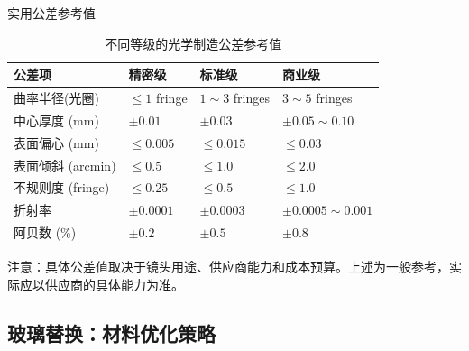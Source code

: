 \begin{frame}{实用公差参考值}
    \begin{table}
        \centering
        \small
        \setlength{\tabcolsep}{3pt}
        \begin{tabular}{p{2.8cm}|p{2.5cm}|p{2.5cm}|p{2.5cm}}
            \toprule
            \textbf{公差项} & \textbf{精密级} & \textbf{标准级} & \textbf{商业级} \\
            \midrule
            曲率半径(光圈) & $\le 1$ fringe & $1\sim 3$ fringes & $3\sim 5$ fringes \\
            中心厚度 (mm)     & $\pm 0.01$ & $\pm 0.03$ & $\pm 0.05\sim 0.10$ \\
            表面偏心 (mm)     & $\le 0.005$ & $\le 0.015$ & $\le 0.03$ \\
            表面倾斜 (arcmin) & $\le 0.5$ & $\le 1.0$ & $\le 2.0$ \\
            不规则度 (fringe) & $\le 0.25$ & $\le 0.5$ & $\le 1.0$ \\
            折射率             & $\pm 0.0001$ & $\pm 0.0003$ & $\pm 0.0005\sim 0.001$ \\
            阿贝数 (\%)        & $\pm 0.2$ & $\pm 0.5$ & $\pm 0.8$ \\
            \bottomrule
        \end{tabular}
        \caption{不同等级的光学制造公差参考值}
        \label{tab:tolerance_guidelines}
    \end{table}

    \alert{注意：}具体公差值取决于镜头用途、供应商能力和成本预算。上述为一般参考，实际应以供应商的具体能力为准。
\end{frame}

\subsection{玻璃替换：材料优化策略}

